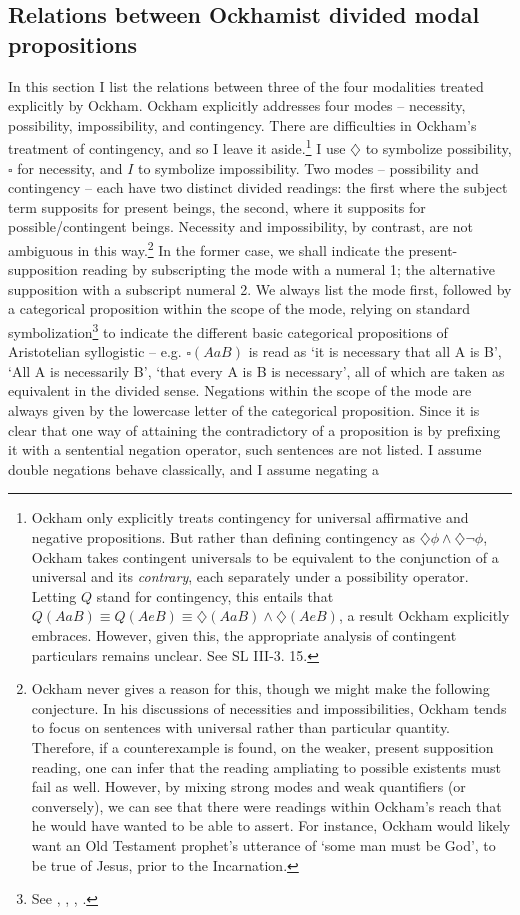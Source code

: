 \documentclass[a4paper]{article}
\begin{document}
\subsection{Relations between Ockhamist divided modal propositions}
In this section I list the relations between three of the four modalities treated explicitly by Ockham. Ockham explicitly addresses four modes – necessity, possibility, impossibility, and contingency. There are difficulties in Ockham's treatment of contingency, and so I leave it aside.\footnote{Ockham only explicitly treats contingency for universal affirmative and negative propositions. But rather than defining contingency as $\diamondsuit\phi \wedge \diamondsuit \neg \phi$, Ockham takes contingent universals to be equivalent to the conjunction of a universal and its \textit{contrary}, each separately under a possibility operator. Letting $Q$ stand for contingency, this entails that $Q(AaB) \equiv Q(AeB) \equiv \diamondsuit(AaB) \wedge \diamondsuit(AeB)$, a result Ockham explicitly embraces. However, given this, the appropriate analysis of contingent particulars remains unclear. See SL III-3. 15.}  I use $\diamondsuit$  to symbolize possibility, $\square$ for necessity, and $I$ to symbolize impossibility. Two modes – possibility and contingency – each have two distinct divided readings: the first where the subject term supposits for present beings, the second, where it supposits for possible/contingent beings. Necessity and impossibility, by contrast, are not ambiguous in this way.\footnote{Ockham never gives a reason for this, though we might make the following conjecture. In his discussions of necessities and impossibilities, Ockham tends to focus on sentences with universal rather than particular quantity. Therefore, if a counterexample is found, on the weaker, present supposition reading, one can infer that the reading ampliating to possible existents must fail as well. However, by mixing strong modes and weak quantifiers (or conversely), we can see that there were readings within Ockham’s reach that he would have wanted to be able to assert. For instance, Ockham would likely want an Old Testament prophet’s utterance of `some man must be God', to be true of Jesus, prior to the Incarnation.}  In the former case, we shall indicate the present-supposition reading by subscripting the mode with a numeral 1; the alternative supposition with a subscript numeral 2. We always list the mode first, followed by a categorical proposition within the scope of the mode, relying on standard symbolization\footnote{See \cite{Corcoran1972b}, \cite{AristotleSmith}, \cite{Uckelman2010b}, \cite{Johnston2015b}.} to indicate the different basic categorical propositions of Aristotelian syllogistic – e.g. $\square(AaB)$ is read as `it is necessary that all A is B', `All A is necessarily B', `that every A is B is necessary', all of which are taken as equivalent in the divided sense. Negations within the scope of the mode are always given by the lowercase letter of the categorical proposition. Since it is clear that one way of attaining the contradictory of a proposition is by prefixing it with a sentential negation operator, such sentences are not listed. I assume double negations behave classically, and I assume negating a 
\end{document}
